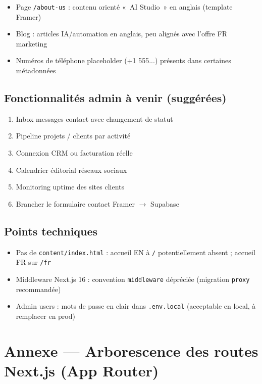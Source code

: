 \documentclass[11pt,a4paper]{report}
\begin{document}
\begin{itemize}[leftmargin=*]
  \item Page \texttt{/about-us} : contenu orienté «~AI Studio~» en anglais (template Framer)
  \item Blog : articles IA/automation en anglais, peu alignés avec l'offre FR marketing
  \item Numéros de téléphone placeholder (+1 555...) présents dans certaines métadonnées
\end{itemize}

\section{Fonctionnalités admin à venir (suggérées)}

\begin{enumerate}[leftmargin=*]
  \item Inbox messages contact avec changement de statut
  \item Pipeline projets / clients par activité
  \item Connexion CRM ou facturation réelle
  \item Calendrier éditorial réseaux sociaux
  \item Monitoring uptime des sites clients
  \item Brancher le formulaire contact Framer $\rightarrow$ Supabase
\end{enumerate}

\section{Points techniques}

\begin{itemize}[leftmargin=*]
  \item Pas de \texttt{content/index.html} : accueil EN à \texttt{/} potentiellement absent ; accueil FR sur \texttt{/fr}
  \item Middleware Next.js 16 : convention \texttt{middleware} dépréciée (migration \texttt{proxy} recommandée)
  \item Admin users : mots de passe en clair dans \texttt{.env.local} (acceptable en local, à remplacer en prod)
\end{itemize}

\chapter{Annexe — Arborescence des routes Next.js (App Router)}
\end{document}
